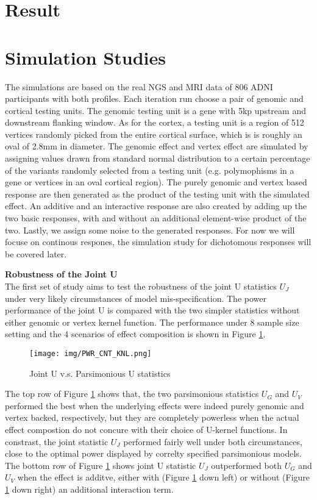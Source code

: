 \section{Result}
\section{Simulation Studies}
The simulations are based on the real NGS and MRI data of 806 ADNI participants with both profiles. Each iteration run choose a pair of genomic and cortical testing units. The genomic testing unit is a gene with 5kp upstream and downstream flanking window. As for the cortex, a testing unit is a region of 512 vertices randomly picked from the entire cortical surface, which is is roughly an oval of 2.8mm in diameter. The genomic effect and vertex effect are simulated by assigning values drawn from standard normal distribution to a certain percentage of the variants randomly selected from a testing unit (e.g. polymophisms in a gene or vertices in an oval cortical region). The purely genomic and vertex based response are then generated as the product of the testing unit with the simulated effect. An additive and an interactive response are also created by adding up the two basic responses, with and without an additional element-wise product of the two. Lastly, we assign some noise to the generated responses. For now we will focuse on continous respones, the simulation study for dichotomous responses will be covered later.

\noindent\textbf{Robustness of the Joint U} \\
The first set of study aims to test the robustness of the joint U statistics $U_J$ under very likely circumstances of model mis-specification. The power performance of the joint U is compared with the two simpler statistics without either genomic or vertex kernel function. The performance under 8 sample size setting and the 4 scenarios of effect composition is shown in Figure \ref{fig:PWR_CNT_KNL}.
\begin{figure}[!htbp]
\label{fig:PWR_CNT_KNL}
\centering
\texttt{[image: img/PWR\_CNT\_KNL.png]}
\caption{Joint U v.s. Parsimonious U statistics}
\end{figure}
The top row of Figure \ref{fig:PWR_CNT_KNL} shows that, the two parsimonious statistics $U_G$ and $U_V$ performed the best when the underlying effects were indeed purely genomic and vertex backed, respectively, but they are completely powerless when the actual effect compostion do not concure with their choice of U-kernel functions. In constrast, the joint statistic $U_J$ performed fairly well under both circumstances, close to the optimal power displayed by correlty specified parsimonious models. The bottom row of Figure \ref{fig:PWR_CNT_KNL} shows joint U statistic $U_J$ outperformed both $U_G$ and $U_V$ when the effect is additve, either with (Figure \ref{fig:PWR_CNT_KNL} down left) or without (Figure \ref{fig:PWR_CNT_KNL} down right) an additional interaction term.

